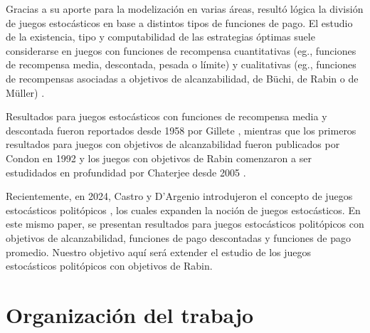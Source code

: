 Gracias a su aporte para la modelización en varias áreas, resultó lógica la
división de juegos estocásticos en base a distintos tipos de funciones de pago.
El estudio de la existencia, tipo y computabilidad de las estrategias óptimas
suele considerarse en juegos con funciones de recompensa cuantitativas (eg.,
funciones de recompensa media, descontada, pesada o límite) y cualitativas
(eg., funciones de recompensas asociadas a objetivos de alcanzabilidad, de
Büchi, de Rabin o de Müller) \cite{Chatterjee2007,Kučera2011,Chatterjee1}.

Resultados para juegos estocásticos con funciones de recompensa media y
descontada fueron reportados desde 1958 por Gillete \cite{Gillette1958},
mientras que los primeros resultados para juegos con objetivos de
alcanzabilidad fueron publicados por Condon en 1992 \cite{CONDON1992} y los
juegos con objetivos de Rabin comenzaron a ser estudidados en profundidad por
Chaterjee desde 2005 \cite{ComplexityRabin,Chatterjee2007,Chatterjee1}.

Recientemente, en 2024, Castro y D'Argenio introdujeron el concepto de juegos
estocásticos politópicos \cite{Polytopal}, los cuales expanden la noción de
juegos estocásticos.
En este mismo paper, se presentan resultados para juegos estocásticos
politópicos con objetivos de alcanzabilidad, funciones de pago descontadas y
funciones de pago promedio. Nuestro objetivo aquí será extender el estudio de
los juegos estocásticos politópicos con objetivos de Rabin.

\section{Organización del trabajo}
~\label{cap:intro:sec:outline}

